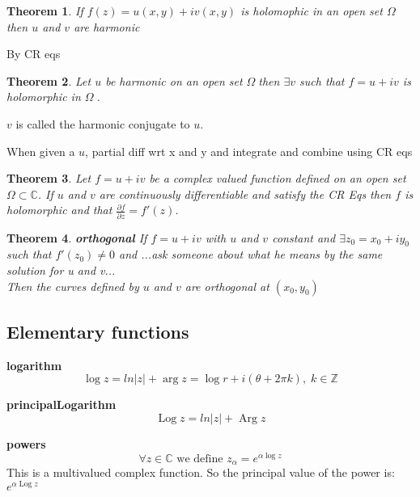 \documentclass{article}
\newtheorem{theorem}{Theorem}[section]
\newenvironment{proof}[1][Proof]{\begin{trivlist}
\item[\hskip \labelsep {\bfseries #1}]}{\end{trivlist}}
\newenvironment{definition}[1][Definition]{\begin{trivlist}
\item[\hskip \labelsep {\bfseries #1}]}{\end{trivlist}}
\newenvironment{example}[1][Example]{\begin{trivlist}
\item[\hskip \labelsep {\bfseries #1}]}{\end{trivlist}}
\newcommand{\C}{\mathbb{C}}
\newcommand{\OO}{$ \Omega \;$}
\newcommand{\Log}{\operatorname{Log}}
\newcommand{\Arg}{\operatorname{Arg}}
\begin{document}
\begin{theorem}
    If $f(z) = u(x,y) + iv(x,y)$ is holomophic in an open set \OO then $u$ and $v$ are harmonic
\end{theorem}
\begin{proof}
    By CR eqs
\end{proof}

\begin{theorem}
    Let $u$ be harmonic on an open set \OO then $\exists v$ such that $f = u + iv$ is holomorphic in \OO.
\end{theorem}
$v$ is called the harmonic conjugate to $u$.
\begin{example}
    When given a $u$, partial diff wrt x and y and integrate and combine using CR eqs
\end{example}

\begin{theorem}
    Let $f=u+iv$ be a complex valued function defined on an open set $\Omega \subset \C$.
    If $u$ and $v$ are continuously differentiable and satisfy the CR Eqs then $f$ is holomorphic
    and that $\frac{\partial f}{\partial z} = f'(z)$.
\end{theorem}

\begin{theorem} \label{orthogonal} \textbf{orthogonal}
    If $f= u + iv$ with $u$ and $v$ constant and $\exists z_0 = x_0 + iy_0$ such that 
    $f'(z_0) \neq 0$ and ...ask someone about what he means by the same solution for u and v...\\
    Then the curves defined by $u$ and $v$ are orthogonal at $(x_0,y_0)$
\end{theorem}

\subsection*{Elementary functions}

\begin{definition} \label{logarithm} \textbf{logarithm}
    $$\log z = ln |z| + \arg z = \log r + i(\theta  + 2\pi k), \; k \in \mathbb{Z}$$
\end{definition}
\begin{definition} \label{principalLogarithm} \textbf{principalLogarithm}
    $$\Log z = ln |z| + \Arg z$$
\end{definition}

\begin{definition} \label{powers} \textbf{powers}
    \[\forall z \in \C \text{ we define } z_\alpha = e^{\alpha \log z}\]
    This is a multivalued complex function. So the principal value of the power is: $e^{\alpha \Log z}$
\end{definition}
\end{document}
